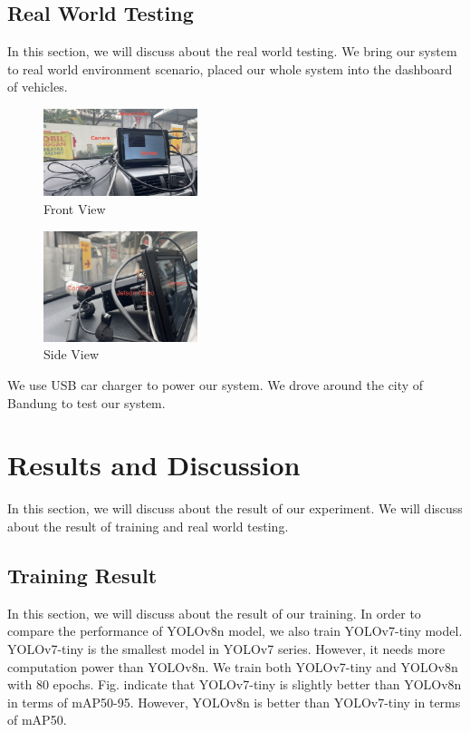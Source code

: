 \documentclass[conference]{IEEEtran}
\begin{document}
\subsection{Real World Testing}
In this section, we will discuss about the real world testing. We bring our system to real world environment scenario, placed our whole system into the dashboard of vehicles.
\begin{figure}[h!]
    \centering
    \includegraphics[width=0.4\textwidth,keepaspectratio]{mounted_camera_front_view.jpg}
    \caption{Front View}
    \label{fig:front_view}
\end{figure}

\begin{figure}[h!]
    \centering
    \includegraphics[width=0.4\textwidth,keepaspectratio]{mounted_camera_side_view.jpg}
    \caption{Side View}
    \label{fig:side_view}
\end{figure}
We use USB car charger to power our system. We drove around the city of Bandung to test our system. 

\section{Results and Discussion}
In this section, we will discuss about the result of our experiment. We will discuss about the result of training and real world testing.
\subsection{Training Result}
In this section, we will discuss about the result of our training. In order to compare the performance of YOLOv8n model, we also train YOLOv7-tiny model.
YOLOv7-tiny is the smallest model in YOLOv7 series. However, it needs more computation power than YOLOv8n. We train both YOLOv7-tiny and YOLOv8n with 80 epochs.
Fig. indicate that YOLOv7-tiny is slightly better than YOLOv8n in terms of mAP50-95. However, YOLOv8n is better than YOLOv7-tiny in terms of mAP50.
\end{document}
